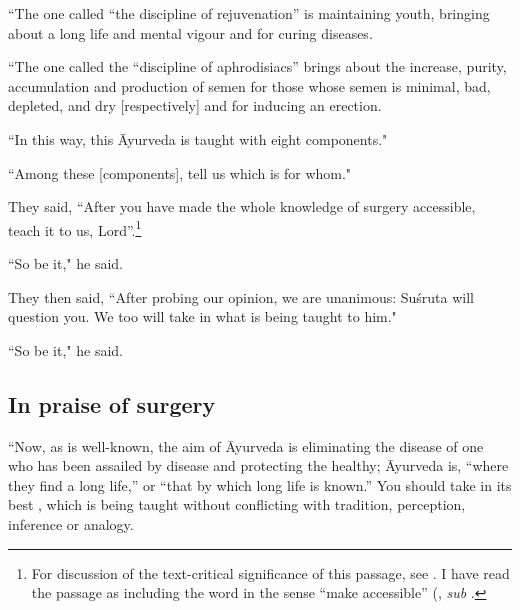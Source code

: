 \begin{translation}
    \item[8.7] 
    
“The one called “the discipline of rejuvenation” is maintaining
youth, bringing about a long life and mental vigour and for curing
diseases.
    
    
    \item[8.8] 
    
“The one called the “discipline of aphrodisiacs”
brings about the increase, purity, accumulation and  production
of semen for those whose semen is minimal, bad, depleted, and dry
[respectively] and for inducing an erection.
    
    \item[9] 
    
“In this way, this Āyurveda is taught with eight components."
    
“Among these [components], tell us which is for whom."
    
    \item[10] 
    
They said,  “After you have made the
whole knowledge of surgery accessible, teach it to us,
Lord”.\footnote{For discussion of the text-critical significance of
    this passage, see \cite{hari-2013}. I have read the passage as
    including the word  in the sense “make accessible”
    (\cite[cf.][94]{moni-sans}, \emph{sub} .}
    
    \item[11]  “So be it," he said.
    
    \item[12] 
    
They then said,  “After probing our opinion, we are unanimous: Suśruta
will question you. We too will take in what is being taught to him."
    
 \item[13] 
 
“So be it," he said.

\subsection{In praise of surgery}    
    \item[14--16] 

“Now, as is well-known, the aim of Āyurveda is eliminating the
disease of one who has been assailed by disease and protecting the
healthy; Āyurveda is, “where they find a long life,” or “that by
which long life is known.” You should take in its best
, which is being taught without conflicting with
tradition, perception, inference or analogy.
    

\end{translation}
